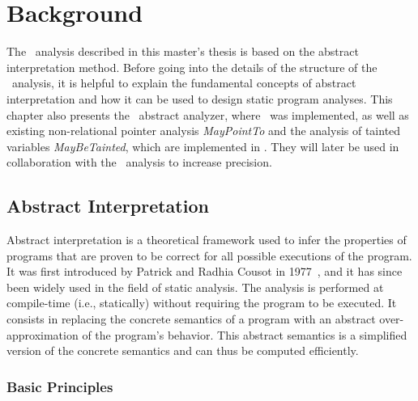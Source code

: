 \chapter{Background}\label{chapter:background}

The \cpo\ analysis described in this master's thesis is based on the abstract interpretation method.
Before going into the details of the structure of the \cpo\ analysis,
it is helpful to explain the fundamental concepts of abstract interpretation and how it can be used to design static program analyses.
This chapter also presents the \goblint\ abstract analyzer, where \cpo\ was implemented, as well as existing non-relational pointer analysis \emph{MayPointTo} and the analysis of tainted variables \emph{MayBeTainted}, which are implemented in \goblint.
They will later be used in collaboration with the \cpo\ analysis to increase precision.

\section{Abstract Interpretation}

Abstract interpretation is a theoretical framework used to infer the properties of programs that are proven to be correct for all possible executions of the program.
It was first introduced by Patrick and Radhia Cousot in 1977~\cite{ai}, and it has since been widely used in the field of static analysis.
The analysis is performed at compile-time (i.e., statically) without requiring the program to be executed.
It consists in replacing the concrete
semantics of a program with an abstract over-approximation of the program's behavior.
This abstract semantics is a simplified version of the concrete semantics
and can thus be computed efficiently.

\subsection{Basic Principles}



